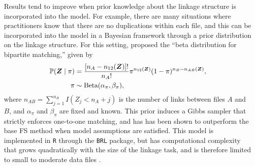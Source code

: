\documentclass[12pt,letterpaper]{article}
\newcommand{\1}[1]{\mathbb{I}\!\left[#1\right]} %
\begin{document}
Results tend to improve when prior knowledge about the linkage structure is incorporated into the model. For example, there are many situations where practitioners know that there are no duplications within each file, and this can be incorporated into the model in a Bayesian framework through a prior distribution on the linkage structure. For this setting, \cite{sadinle_bayesian_2017} proposed the ``beta distribution for bipartite matching,'' given by
\begin{align}
	\label{eqn:brlprior}
	\mathbb{P}(\bm{Z}\mid \pi) &=\dfrac{[n_A-n_{12}(\bm{Z})]!}{n_A!} %
	\pi^{n_{12}(\bm{Z})}(1-\pi)^{n_B-n_{AB}(\bm{Z})},  	\\
	\pi &\sim \text{Beta}(\alpha_{\pi}, \beta_{\pi}), \notag
\end{align}
where $n_{AB} = \sum_{j=1}^{n_B} I(Z_j < n_A + j)$ is the number of links between files $A$ and $B$, and $\alpha_{\pi}$ and $\beta_{\pi}$ are fixed and known. This prior induces a Gibbs sampler that strictly enforces one-to-one matching, and has has been shown to outperform the base FS method when model assumptions are satisfied. This model is implemented in \texttt{R} through the \texttt{BRL} package, but has computational complexity that grows quadratically with the size of the linkage task, and is therefore limited to small to moderate data files \citep{BRL}.
\end{document}
